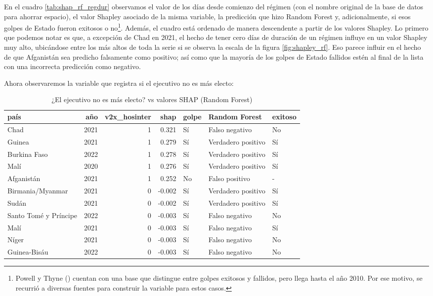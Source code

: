 \documentclass{article}
\begin{document}
En el cuadro \ref{tab:shap_rf_regdur} observamos el valor de los días desde comienzo del régimen
(con el nombre original de la base de datos para ahorrar espacio), el valor Shapley asociado de la 
misma variable, la predicción que hizo Random Forest y, adicionalmente, si esos golpes de Estado 
fueron exitosos o no\footnote{Powell y Thyne (\citeyear{Pow11}) 
cuentan con una base que distingue entre golpes exitosos y fallidos, pero llega hasta el año 2010. Por
ese motivo, se recurrió a diversas fuentes para construir la variable para estos casos.}. 
Además, el cuadro está ordenado de manera descendente a partir de los valores Shapley. Lo primero que 
podemos notar es que, a excepción de Chad en 2021, el hecho de tener cero días de duración de un 
régimen influye en un valor Shapley muy alto, ubicándose entre los más altos de toda la serie si se 
observa la escala de la figura \ref{fig:shapley_rf}. Eso parece influir en el hecho de que Afganistán 
sea predicho falsamente como positivo; así como que la mayoría de los golpes de Estado fallidos estén 
al final de la lista con una incorrecta predicción como negativo.

Ahora observaremos la variable que registra si el ejecutivo no es más electo:

\begin{table}[H]
 \centering
 \begin{tabular}{lrrrlll}
  \toprule
  país & año & v2x\_hosinter & shap & golpe & Random Forest & exitoso \\
  \midrule
  Chad & 2021 & 1 & 0.321 & Sí & Falso negativo & No \\
  Guinea & 2021 & 1 & 0.279 & Sí & Verdadero positivo & Sí \\
  Burkina Faso & 2022 & 1 & 0.278 & Sí & Verdadero positivo & Sí \\
  Malí & 2020 & 1 & 0.276 & Sí & Verdadero positivo & Sí \\
  Afganistán & 2021 & 1 & 0.252 & No & Falso positivo & - \\
  Birmania/Myanmar & 2021 & 0 & -0.002 & Sí & Verdadero positivo & Sí \\
  Sudán & 2021 & 0 & -0.002 & Sí & Verdadero positivo & Sí \\
  Santo Tomé y Príncipe & 2022 & 0 & -0.003 & Sí & Falso negativo & No \\
  Malí & 2021 & 0 & -0.003 & Sí & Falso negativo & Sí \\
  Níger & 2021 & 0 & -0.003 & Sí & Falso negativo & No \\
  Guinea-Bisáu & 2022 & 0 & -0.003 & Sí & Falso negativo & No \\
  \bottomrule
  \end{tabular}
\caption{¿El ejecutivo no es más electo? vs valores SHAP (Random Forest) \label{tab:shap_rf_hosinter}}
\end{table}
\end{document}
